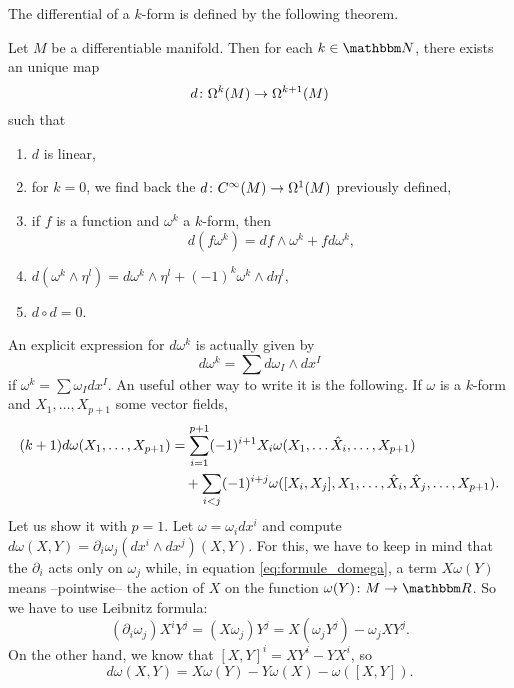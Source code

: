 The differential of a $k$-form is defined by the following theorem.

\begin{theorem}
Let $M$ be a differentiable manifold. Then for each $k\in \eN$, there exists an unique map
\[
  d\colon \Omega^k(M)\to \Omega^{k+1}(M)
\]
such that

\begin{enumerate}
\item $d$ is linear,
\item for $k=0$, we find back the $d\colon C^{\infty}(M)\to \Omega^1(M)$ previously defined,
\item if $f$ is a function and $\omega^k$ a $k$-form, then 
\begin{equation}
d(f\omega^k)=df\wedge\omega^k+fd\omega^k,
\end{equation}


\item $d(\omega^k\wedge\eta^l)=d\omega^k\wedge\eta^l+(-1)^k\omega^k\wedge d\eta^l$,
\item $d\circ d=0$.
\end{enumerate}
\end{theorem}

An explicit expression for $d\omega^k$ is actually given by
\begin{equation}
   d\omega^k=\sum d\omega_I\wedge dx^I
\end{equation}
if $\omega^k=\sum\omega_I dx^I$.
An useful other way to write it is the following. If $\omega$ is a $k$-form and $X_1,\ldots,X_{p+1}$ some vector fields,
\begin{equation}\label{eq:formule_domega}
\begin{split}
  (k+1)d\omega(X_1,\ldots,X_{p+1})&=\sum_{i=1}^{p+1}(-1)^{i+1}X_i\omega(X_1,\ldots\hat{X}_i,\ldots,X_{p+1})\\
                                  &\quad+\sum_{i<j}(-1)^{i+j}\omega([X_i,X_j],X_1,\ldots,\hat{X}_i,\hat{X}_j,\ldots,X_{p+1}).
\end{split}
\end{equation}
Let us show it with $p=1$. Let $\omega=\omega_i dx^i$ and compute $d\omega(X,Y)=\partial_i\omega_j(dx^i\wedge dx^j)(X,Y)$. For this, we have to keep in mind that the $\partial_i$ acts only on $\omega_j$ while, in equation \eqref{eq:formule_domega}, a term $X\omega(Y)$ means --pointwise-- the action of $X$ on the function $\dpt{\omega(Y)}{M}{\eR}$. So we have to use Leibnitz formula:
\[
  (\partial_i\omega_j)X^iY^j=(X\omega_j)Y^j
                            =X(\omega_j Y^j)-\omega_j XY^j.
\]
On the other hand, we know that $[X,Y]^i=XY^i-YX^i$, so
\begin{equation}
   d\omega(X,Y)=X\omega(Y)-Y\omega(X)-\omega([X,Y]).
\end{equation}

